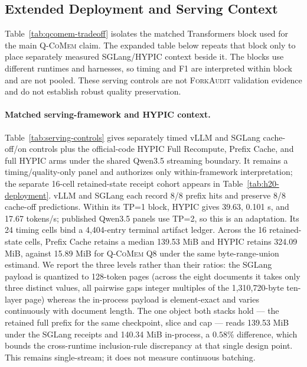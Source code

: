 \documentclass{article}
\newcommand{\qcomem}{\textsc{Q-CoMem}}
\newcommand{\method}{\textsc{ForkAudit}}
\begin{document}
\subsection{Extended Deployment and Serving Context}
\label{app:illustrative-store}

Table~\ref{tab:qcomem-tradeoff} isolates the matched Transformers block used for
the main \qcomem{} claim.  The expanded table below repeats that block only to
place separately measured SGLang/HYPIC context beside it.  The blocks use
different runtimes and harnesses, so timing and F1 are interpreted within block
and are not pooled.  These serving controls are not \method{} validation
evidence and do not establish robust quality preservation.



\paragraph{Matched serving-framework and HYPIC context.}
Table~\ref{tab:serving-controls} gives separately timed vLLM and SGLang
cache-off/on controls plus the official-code HYPIC Full Recompute, Prefix
Cache, and full HYPIC arms under the shared Qwen3.5 streaming boundary.  It
remains a timing/quality-only panel and authorizes only within-framework
interpretation; the separate 16-cell retained-state receipt cohort appears in
Table~\ref{tab:h20-deployment}.
vLLM and SGLang each record 8/8 prefix hits and preserve 8/8 cache-off
predictions.  Within its TP=1 block, HYPIC gives 39.63, 0.101 s, and 17.67
tokens/s; published Qwen3.5 panels use TP=2, so this is an adaptation.  Its 24
timing cells bind a 4,404-entry terminal artifact ledger.  Across the
16 retained-state cells, Prefix Cache retains a median 139.53 MiB and HYPIC
retains 324.09 MiB, against 15.89 MiB for \qcomem{} Q8 under the same
byte-range-union estimand.  We report the three levels rather than their
ratios: the SGLang payload is quantized to 128-token pages (across the eight
documents it takes only three distinct values, all pairwise gaps integer
multiples of the 1,310,720-byte ten-layer page) whereas the in-process payload
is element-exact and varies continuously with document length.  The one object
both stacks hold --- the retained full prefix for the same checkpoint, slice
and cap --- reads 139.53 MiB under the SGLang receipts and 140.34 MiB
in-process, a $0.58\%$ difference, which bounds the cross-runtime
inclusion-rule discrepancy at that single design point.  This remains
single-stream; it does not measure continuous batching.

\end{document}
